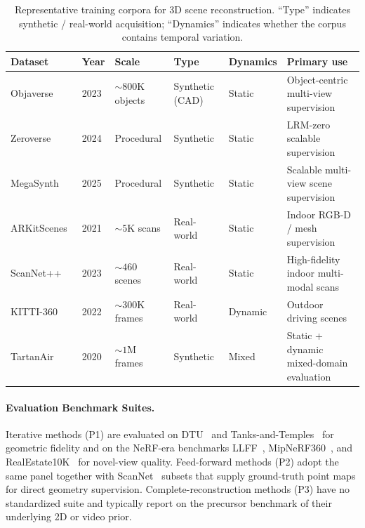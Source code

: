 \begin{table}[t]
    \centering
    \fontsize{8}{10}\selectfont
    \setlength{\tabcolsep}{1.0mm}
    \caption{Representative training corpora for 3D scene reconstruction. ``Type'' indicates synthetic / real-world acquisition; ``Dynamics'' indicates whether the corpus contains temporal variation.}
    \label{tab:p3_s8_2_3_corpora}
    \begin{tabular}{L{0.17\textwidth} C{0.06\textwidth} C{0.14\textwidth} L{0.13\textwidth} C{0.09\textwidth} L{0.33\textwidth}}
        \toprule
        \textbf{Dataset} & \textbf{Year} & \textbf{Scale} & \textbf{Type} & \textbf{Dynamics} & \textbf{Primary use} \\
        \midrule
        Objaverse~\cite{deitke2023objaverse} & 2023 & ${\sim}800\mathrm{K}$ objects & Synthetic (CAD) & Static & Object-centric multi-view supervision \\
        Zeroverse~\cite{xie2024lrmzero} & 2024 & Procedural & Synthetic & Static & LRM-zero scalable supervision \\
        MegaSynth~\cite{jiang2025megasynth} & 2025 & Procedural & Synthetic & Static & Scalable multi-view scene supervision \\
        ARKitScenes~\cite{baruch2021arkitscenes} & 2021 & ${\sim}5\mathrm{K}$ scans & Real-world & Static & Indoor RGB-D / mesh supervision \\
        ScanNet++~\cite{yeshwanth2023scannet++} & 2023 & ${\sim}460$ scenes & Real-world & Static & High-fidelity indoor multi-modal scans \\
        KITTI-360~\cite{liao2022kitti360} & 2022 & ${\sim}300\mathrm{K}$ frames & Real-world & Dynamic & Outdoor driving scenes \\
        TartanAir~\cite{TartanAir} & 2020 & ${\sim}1\mathrm{M}$ frames & Synthetic & Mixed & Static + dynamic mixed-domain evaluation \\
        \bottomrule
    \end{tabular}
\end{table}

\paragraph{Evaluation Benchmark Suites.}
Iterative methods (P1) are evaluated on DTU~\cite{Aanaes2016DTU} and Tanks-and-Temples~\cite{knapitsch2017tanks} for geometric fidelity and on the NeRF-era benchmarks LLFF~\cite{mildenhall2019llff}, MipNeRF360~\cite{barron2022mip}, and RealEstate10K~\cite{zhou2018stereo} for novel-view quality.
Feed-forward methods (P2) adopt the same panel together with ScanNet~\cite{dai2017scannet} subsets that supply ground-truth point maps for direct geometry supervision.
Complete-reconstruction methods (P3) have no standardized suite and typically report on the precursor benchmark of their underlying 2D or video prior.

